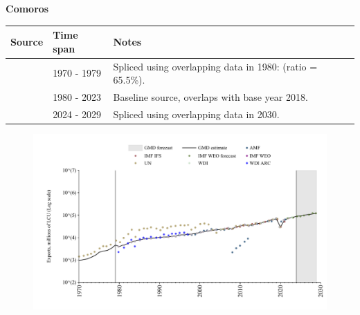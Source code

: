 \documentclass[12pt,a4paper,landscape]{article}
\begin{document}
\begin{adjustbox}{max totalsize={\paperwidth}{\paperheight},center}
\begin{minipage}[t][\textheight][t]{\textwidth}
\vspace*{0.5cm}
{}
\begin{center}
{\Large\bfseries Comoros}
\end{center}
\vspace{0.5cm}
\begin{table}[H]
\centering
\small
\begin{tabular}{|l|l|l|}
\hline
\textbf{Source} & \textbf{Time span} & \textbf{Notes} \\
\hline
\rowcolor{white}\cite{UN}& 1970 - 1979 &Spliced using overlapping data in 1980: (ratio = 65.5\%).\\
\rowcolor{lightgray}\cite{WDI}& 1980 - 2023 &Baseline source, overlaps with base year 2018.\\
\rowcolor{white}\cite{IMF_WEO_forecast}& 2024 - 2029 &Spliced using overlapping data in 2030.\\
\hline
\end{tabular}
\end{table}
\begin{figure}[H]
\centering
\includegraphics[width=\textwidth,height=0.6\textheight,keepaspectratio]{graphs/COM_exports.pdf}
\end{figure}
\end{minipage}
\end{adjustbox}
\end{document}
